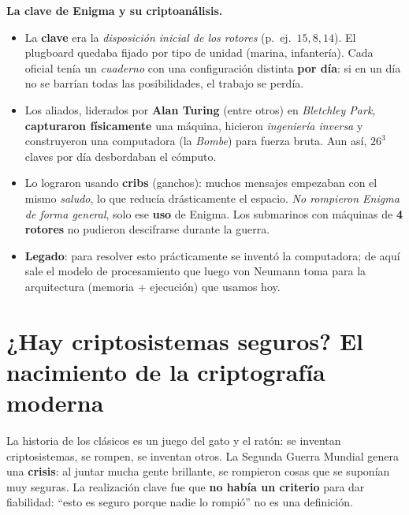 \documentclass[11pt,a4paper]{article}
\begin{document}
\begin{notebox}
\textbf{La clave de Enigma y su criptoanálisis.}
\begin{itemize}[leftmargin=1.3em,itemsep=1pt]
  \item La \textbf{clave} era la \emph{disposición inicial de los rotores} (p.\ ej.\
        $15,8,14$). El plugboard quedaba fijado por tipo de unidad (marina, infantería). Cada
        oficial tenía un \emph{cuaderno} con una configuración distinta \textbf{por día}: si
        en un día no se barrían todas las posibilidades, el trabajo se perdía.
  \item Los aliados, liderados por \textbf{Alan Turing} (entre otros) en \emph{Bletchley
        Park}, \textbf{capturaron físicamente} una máquina, hicieron \emph{ingeniería
        inversa} y construyeron una computadora (la \emph{Bombe}) para fuerza bruta. Aun así,
        $26^3$ claves por día desbordaban el cómputo.
  \item Lo lograron usando \textbf{cribs} (ganchos): muchos mensajes empezaban con el mismo
        \emph{saludo}, lo que reducía drásticamente el espacio. \emph{No rompieron Enigma de
        forma general}, solo ese \textbf{uso} de Enigma. Los submarinos con máquinas de
        \textbf{4 rotores} no pudieron descifrarse durante la guerra.
  \item \textbf{Legado}: para resolver esto prácticamente se inventó la computadora; de aquí
        sale el modelo de procesamiento que luego von Neumann toma para la arquitectura
        (memoria + ejecución) que usamos hoy.
\end{itemize}
\end{notebox}

\section{¿Hay criptosistemas seguros? El nacimiento de la criptografía moderna}

La historia de los clásicos es un juego del gato y el ratón: se inventan criptosistemas, se
rompen, se inventan otros. La Segunda Guerra Mundial genera una \textbf{crisis}: al juntar
mucha gente brillante, se rompieron cosas que se suponían muy seguras. La realización clave
fue que \textbf{no había un criterio} para dar fiabilidad: ``esto es seguro porque nadie lo
rompió'' no es una definición.
\end{document}

